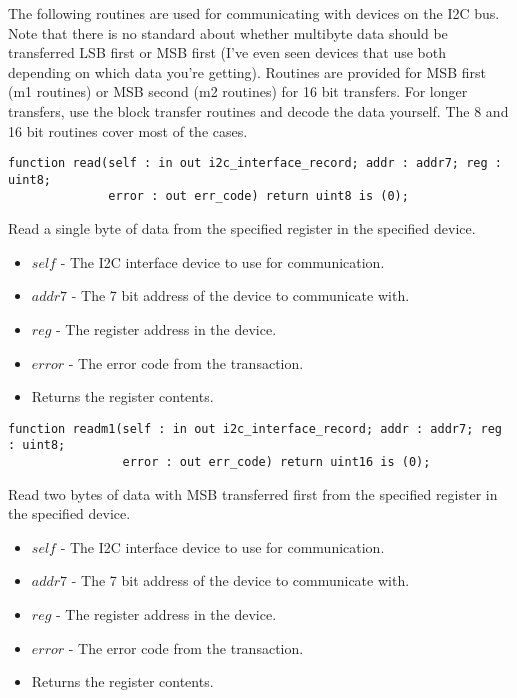 \documentclass[10pt, openany]{book}
\begin{document}
The following routines are used for communicating with devices on the I2C bus.  Note that there is no standard about whether multibyte data should be transferred LSB first or MSB first (I've even seen devices that use both depending on which data you're getting).  Routines are provided for MSB first (m1 routines) or MSB second (m2 routines) for 16 bit transfers.  For longer transfers, use the block transfer routines and decode the data yourself.  The 8 and 16 bit routines cover most of the cases.
\begin{lstlisting}
function read(self : in out i2c_interface_record; addr : addr7; reg : uint8;
              error : out err_code) return uint8 is (0);
\end{lstlisting}
Read a single byte of data from the specified register in the specified device.
\begin{itemize}
  \item $self$ - The I2C interface device to use for communication.
  \item $addr7$ - The 7 bit address of the device to communicate with.
  \item $reg$ - The register address in the device.
  \item $error$ - The error code from the transaction.
  \item Returns the register contents.
\end{itemize}

\begin{lstlisting}
function readm1(self : in out i2c_interface_record; addr : addr7; reg : uint8;
                error : out err_code) return uint16 is (0);
\end{lstlisting}
Read two bytes of data with MSB transferred first from the specified register in the specified device.
\begin{itemize}
  \item $self$ - The I2C interface device to use for communication.
  \item $addr7$ - The 7 bit address of the device to communicate with.
  \item $reg$ - The register address in the device.
  \item $error$ - The error code from the transaction.
  \item Returns the register contents.
\end{itemize}
\end{document}
